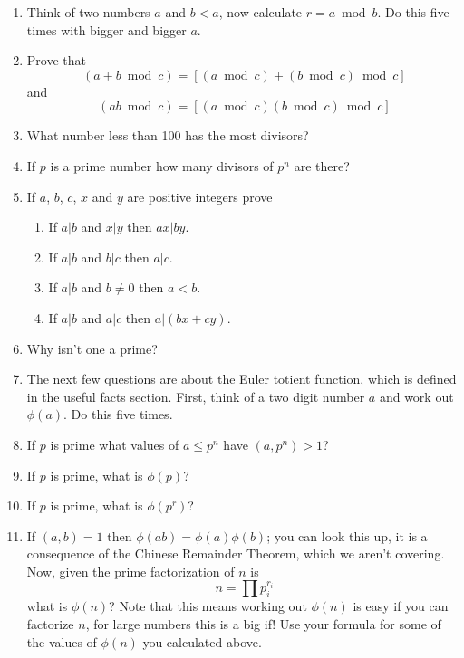 \documentclass[12pt]{article}
\begin{document}
\begin{enumerate}

\item Think of two numbers $a$ and $b<a$, now calculate $r=a\bmod
  b$. Do this five times with bigger and bigger $a$. 


\item Prove that 
\begin{equation}
(a+b\bmod{c})=[(a \bmod{c})+(b \bmod{c}) \bmod{c}]
\end{equation}
and
\begin{equation}
(ab\bmod{c})=[(a \bmod{c})(b \bmod{c}) \bmod{c}]
\end{equation}



\item What number less than 100 has the most divisors?

\item If $p$ is a prime number how many divisors of $p^n$ are there?

\item If $a$, $b$, $c$, $x$ and $y$ are positive integers prove
\begin{enumerate}
\item If $a|b$ and $x|y$ then $ax|by$.
\item If $a|b$ and $b|c$ then $a|c$.
\item If $a|b$ and $b\not=0$ then $a<b$.
\item If $a|b$ and $a|c$ then $a|(bx+cy)$.
\end{enumerate}

\item Why isn't one a prime?



\item The next few questions are about the Euler totient function,
  which is defined in the useful facts section. First, think of a two
  digit number $a$ and work out $\phi(a)$. Do this five times.


\item If $p$ is prime what values of $a\le p^n$ have $(a,p^n)>1$?

\item If $p$ is prime, what is $\phi(p)$?

\item If $p$ is prime, what is $\phi(p^r)$?

\item If $(a,b)=1$ then $\phi(ab)=\phi(a)\phi(b)$; you can look this
  up, it is a consequence of the Chinese Remainder Theorem, which we
  aren't covering. Now, given the prime factorization of $n$ is
\begin{equation}
n=\prod p_i^{r_i}
\end{equation}
what is $\phi(n)$? Note that this means working out $\phi(n)$ is easy
if you can factorize $n$, for large numbers this is a big if! Use your
formula for some of the values of $\phi(n)$ you calculated above.


\end{enumerate}
\end{document}
